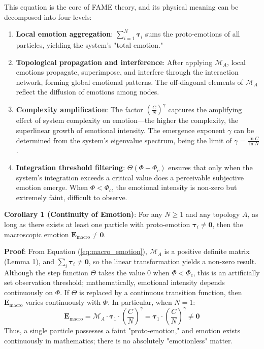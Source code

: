 \documentclass[12pt,a4paper]{article}
\theoremstyle{plain}
\newcommand{\ve}[1]{\bm{#1}}                    %
\newcommand{\Evec}{\ve{E}}                        %
\begin{document}
This equation is the core of FAME theory, and its physical meaning can be decomposed into four levels:
\begin{enumerate}
    \item \textbf{Local emotion aggregation}: $\sum_{i=1}^N \ve{\tau}_i$ sums the proto-emotions of all particles, yielding the system's "total emotion."
    \item \textbf{Topological propagation and interference}: After applying $\mathcal{M}_A$, local emotions propagate, superimpose, and interfere through the interaction network, forming global emotional patterns. The off-diagonal elements of $\mathcal{M}_A$ reflect the diffusion of emotions among nodes.
    \item \textbf{Complexity amplification}: The factor $(\frac{C}{N})^\gamma$ captures the amplifying effect of system complexity on emotion—the higher the complexity, the superlinear growth of emotional intensity. The emergence exponent $\gamma$ can be determined from the system's eigenvalue spectrum, being the limit of $\gamma = \frac{\ln C}{\ln N}$.
    \item \textbf{Integration threshold filtering}: $\Theta(\Phi - \Phi_c)$ ensures that only when the system's integration exceeds a critical value does a perceivable subjective emotion emerge. When $\Phi < \Phi_c$, the emotional intensity is non-zero but extremely faint, difficult to observe.
\end{enumerate}

\textbf{Corollary 1 (Continuity of Emotion)}: For any $N \ge 1$ and any topology $A$, as long as there exists at least one particle with proto-emotion $\ve{\tau}_i \neq \mathbf{0}$, then the macroscopic emotion $\Evec_{\text{macro}} \neq \mathbf{0}$.

\textbf{Proof}: From Equation (\ref{eq:macro_emotion}), $\mathcal{M}_A$ is a positive definite matrix (Lemma 1), and $\sum_i \ve{\tau}_i \neq \mathbf{0}$, so the linear transformation yields a non-zero result. Although the step function $\Theta$ takes the value 0 when $\Phi < \Phi_c$, this is an artificially set observation threshold; mathematically, emotional intensity depends continuously on $\Phi$. If $\Theta$ is replaced by a continuous transition function, then $\Evec_{\text{macro}}$ varies continuously with $\Phi$. In particular, when $N=1$:
\begin{equation}
\Evec_{\text{macro}} = \mathcal{M}_A \cdot \ve{\tau}_1 \cdot \left( \frac{C}{N} \right)^\gamma = \ve{\tau}_1 \cdot \left( \frac{C}{N} \right)^\gamma \neq \mathbf{0}
\end{equation}
Thus, a single particle possesses a faint "proto-emotion," and emotion exists continuously in mathematics; there is no absolutely "emotionless" matter.
\end{document}
